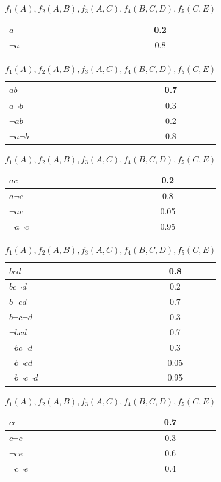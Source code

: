 \documentclass[a4paper, 11pt]{article}
\begin{document}
\begin{enumerate}
\begin{enumerate}[(a)]
      \begin{table}[htbp]
        \centering
        \begin{tabular}{|l|c|}
          \hline
          $a$&0.2\\
          \hline
          $\lnot a$&0.8\\
          \hline
        \end{tabular}
        \begin{tabular}{|l|c|}
          \hline
          $ab$&0.7\\
          \hline
          $a\lnot b$&0.3\\
          \hline
          $\lnot ab$&0.2\\
          \hline
          $\lnot a\lnot b$&0.8\\
          \hline
        \end{tabular}
        \begin{tabular}{|l|c|}
          \hline
          $ac$&0.2\\
          \hline
          $a\lnot c$&0.8\\
          \hline
          $\lnot ac$&0.05\\
          \hline
          $\lnot a\lnot c$&0.95\\
          \hline
        \end{tabular}
        \begin{tabular}{|l|c|}
          \hline
          $bcd$&0.8\\
          \hline
          $bc\lnot d$&0.2\\
          \hline
          $b\lnot cd$&0.7\\
          \hline
          $b\lnot c\lnot d$&0.3\\
          \hline
          $\lnot bcd$&0.7\\
          \hline
          $\lnot bc\lnot d$&0.3\\
          \hline
          $\lnot b \lnot cd$&0.05\\
          \hline
          $\lnot b \lnot c \lnot d$&0.95\\
          \hline
        \end{tabular}
        \begin{tabular}{|l|c|}
          \hline
          $ce$&0.7\\
          \hline
          $c\lnot e$&0.3\\
          \hline
          $\lnot ce$&0.6\\
          \hline
          $\lnot c\lnot e$&0.4\\
          \hline
        \end{tabular}
        \caption{$f_{1}(A), f_{2}(A,B),f_{3}(A,C),f_{4}(B,C,D),f_{5}(C,E)$}
        \label{Q3T1}
      \end{table}


\end{enumerate}
\end{enumerate}
\end{document}
